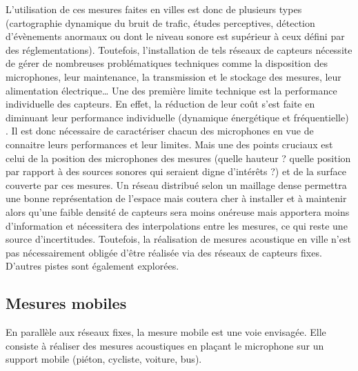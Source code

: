 L'utilisation de ces mesures faites en villes est donc de plusieurs types (cartographie dynamique du bruit de trafic, études perceptives, détection d'évènements anormaux ou dont le niveau sonore est supérieur à ceux défini par des réglementations). Toutefois, l'installation de tels réseaux de capteurs nécessite de gérer de nombreuses problématiques techniques comme la disposition des microphones, leur maintenance, la transmission et le stockage des mesures, leur alimentation électrique\dots{} Une des première limite technique est la performance individuelle des capteurs. En effet, la réduction de leur coût s'est faite en diminuant leur performance  individuelle (dynamique énergétique et fréquentielle) \cite{mydlarz2015design}. Il est donc nécessaire de caractériser chacun des microphones en vue de connaitre leurs performances et leur limites.
Mais une des points cruciaux est celui de la position des microphones des mesures (quelle hauteur ? quelle position par rapport à des sources sonores qui seraient digne d'intérêts ?) et de la surface couverte par ces mesures. Un réseau distribué selon un maillage dense permettra une bonne représentation de l'espace mais coutera cher à installer et à maintenir alors qu'une faible densité de capteurs sera moins onéreuse mais apportera moins d'information et nécessitera des interpolations entre les mesures, ce qui reste une source d'incertitudes.
Toutefois, la réalisation de mesures acoustique en ville n'est pas nécessairement obligée d'être réalisée via des réseaux de capteurs fixes. D'autres pistes sont également explorées.


\subsection{Mesures mobiles}

En parallèle aux réseaux fixes, la mesure mobile est une voie envisagée. Elle consiste à réaliser des mesures acoustiques en plaçant le microphone sur un support mobile (piéton, cycliste, voiture, bus). 

